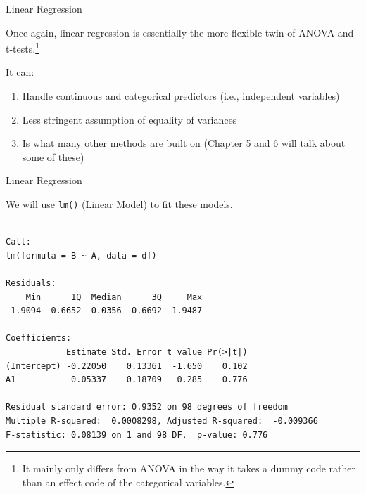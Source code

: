 \begin{frame}{Linear Regression}

\large
Once again, linear regression is essentially the more flexible twin of
ANOVA and
t-tests.\footnote{It mainly only differs from ANOVA in the way it takes a dummy code rather than an effect code of the categorical variables.}

It can:

\begin{enumerate}
\def\labelenumi{\arabic{enumi}.}
\tightlist
\item
  Handle continuous and categorical predictors (i.e., independent
  variables)
\item
  Less stringent assumption of equality of variances
\item
  Is what many other methods are built on (Chapter 5 and 6 will talk
  about some of these)
\end{enumerate}

\end{frame}

\begin{frame}[fragile]{Linear Regression}

We will use \texttt{lm()} (Linear Model) to fit these models.

\small

\begin{Shaded}
\begin{Highlighting}[]
\StringTok{ }\OperatorTok{~}\StringTok{ }
\end{Highlighting}
\end{Shaded}

\begin{verbatim}

Call:
lm(formula = B ~ A, data = df)

Residuals:
    Min      1Q  Median      3Q     Max 
-1.9094 -0.6652  0.0356  0.6692  1.9487 

Coefficients:
            Estimate Std. Error t value Pr(>|t|)
(Intercept) -0.22050    0.13361  -1.650    0.102
A1           0.05337    0.18709   0.285    0.776

Residual standard error: 0.9352 on 98 degrees of freedom
Multiple R-squared:  0.0008298, Adjusted R-squared:  -0.009366 
F-statistic: 0.08139 on 1 and 98 DF,  p-value: 0.776
\end{verbatim}

\end{frame}

